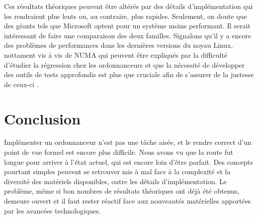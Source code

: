\documentclass[letterpaper]{article}
\begin{document}
Ces résultats théoriques peuvent être altérés par des détails d'implémentation qui les rendraient plus lents ou, au contraire, plus rapides. Seulement, on doute que des géants tels que Microsoft optent pour un système moins performant. Il serait intéressant de faire une comparaison des deux familles. Signalons qu'il y a encore des problèmes de performances dans les dernières versions du noyau Linux, nottament vis à vis de NUMA \citep{lozi2016linux, blagodurov2010case} qui peuvent être expliqués par la difficulté d'étudier la régression chez les ordonnanceurs \citep{chen2007keeping} et que la nécessité de développer des outils de tests approfondis est plus que cruciale afin de s'assurer de la justesse de ceux-ci \citep{erickson2010effective}.

\section{Conclusion}

Implémenter un ordonnanceur n'est pas une tâche aisée, et le rendre correct d'un point de vue formel est encore plus difficile. Nous avons vu que la route fut longue pour arriver à l'état actuel, qui est encore loin d'être parfait. Des concepts pourtant simples peuvent se retrouver mis à mal face à la complexité et la diversité des matériels disponibles, outre les détails d'implémentation. Le problème, même si bon nombres de résultats théoriques ont déjà été obtenus, demeure ouvert et il faut rester réactif face aux nouveautés matérielles apportées par les avancées technologiques.

\footnotesize


\end{document}

